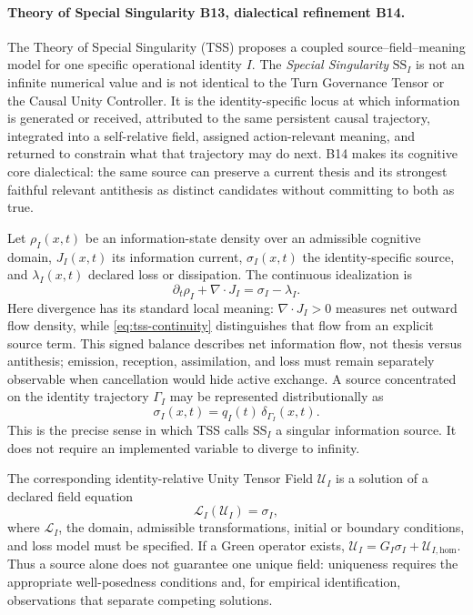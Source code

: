 \documentclass[10pt,twocolumn]{article}
\theoremstyle{definition}
\theoremstyle{plain}
\theoremstyle{remark}
\newcommand{\specialsingularity}{\textsf{B13}}
\newcommand{\dialecticrevision}{\textsf{B14}}
\begin{document}
\paragraph{Theory of Special Singularity \specialsingularity{}, dialectical refinement \dialecticrevision.}
\label{sec:special-singularity}
The Theory of Special Singularity (TSS) proposes a coupled source--field--meaning model for one specific operational identity $I$.  The \emph{Special Singularity} $\mathrm{SS}_I$ is not an infinite numerical value and is not identical to the Turn Governance Tensor or the Causal Unity Controller.  It is the identity-specific locus at which information is generated or received, attributed to the same persistent causal trajectory, integrated into a self-relative field, assigned action-relevant meaning, and returned to constrain what that trajectory may do next.  B14 makes its cognitive core dialectical: the same source can preserve a current thesis and its strongest faithful relevant antithesis as distinct candidates without committing to both as true.

Let $\rho_I(x,t)$ be an information-state density over an admissible cognitive domain, $J_I(x,t)$ its information current, $\sigma_I(x,t)$ the identity-specific source, and $\lambda_I(x,t)$ declared loss or dissipation.  The continuous idealization is
\begin{equation}
\partial_t\rho_I+\nabla\!\cdot J_I=\sigma_I-\lambda_I.
\label{eq:tss-continuity}
\end{equation}
Here divergence has its standard local meaning: $\nabla\!\cdot J_I>0$ measures net outward flow density, while \cref{eq:tss-continuity} distinguishes that flow from an explicit source term.  This signed balance describes net information flow, not thesis versus antithesis; emission, reception, assimilation, and loss must remain separately observable when cancellation would hide active exchange.  A source concentrated on the identity trajectory $\Gamma_I$ may be represented distributionally as
\begin{equation}
\sigma_I(x,t)=q_I(t)\,\delta_{\Gamma_I}(x,t).
\label{eq:tss-source}
\end{equation}
This is the precise sense in which TSS calls $\mathrm{SS}_I$ a singular information source.  It does not require an implemented variable to diverge to infinity.

The corresponding identity-relative Unity Tensor Field $\mathcal U_I$ is a solution of a declared field equation
\begin{equation}
\mathcal L_I(\mathcal U_I)=\sigma_I,
\label{eq:tss-field}
\end{equation}
where $\mathcal L_I$, the domain, admissible transformations, initial or boundary conditions, and loss model must be specified.  If a Green operator exists, $\mathcal U_I=G_I\sigma_I+\mathcal U_{I,\mathrm{hom}}$.  Thus a source alone does not guarantee one unique field: uniqueness requires the appropriate well-posedness conditions and, for empirical identification, observations that separate competing solutions.
\end{document}
